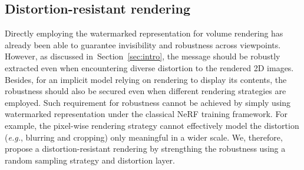 \documentclass[10pt,twocolumn,letterpaper]{article}
\def\eg{{\emph{e.g.}}}
\newcommand{\Sref}[1]{Section~\ref{#1}}
\def\eg{\emph{e.g.}}
\def\eg{{\emph{e.g.}}}
\begin{document}


\subsection{Distortion-resistant rendering}
\label{sec:4.2}
Directly employing the watermarked representation for volume rendering has already been able to guarantee invisibility and robustness across viewpoints. However, as discussed in~\Sref{sec:intro}, the message should be robustly extracted even when encountering diverse distortion to the rendered 2D images. Besides, for an implicit model relying on rendering to display its contents, the robustness should also be secured even when different rendering strategies are employed. Such requirement for robustness cannot be achieved by simply using  watermarked representation under the classical NeRF training framework. For example, the pixel-wise rendering strategy cannot effectively model the distortion (\eg, blurring and cropping) only meaningful in a wider scale. We, therefore, propose a distortion-resistant rendering by strengthing the robustness using a random sampling strategy and distortion layer.

\end{document}
